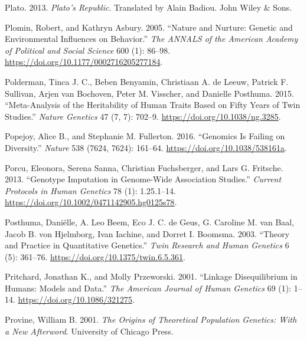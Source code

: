 \documentclass[
]{book}
\newlength{\cslhangindent}
\newlength{\cslentryspacingunit} %
\newenvironment{CSLReferences}[2] %
 {%
  \setlength{\parindent}{0pt}
  \ifodd #1
  \let\oldpar\par
  \def\par{\hangindent=\cslhangindent\oldpar}
  \fi
  \setlength{\parskip}{#2\cslentryspacingunit}
 }%
 {}
\begin{document}
\begin{CSLReferences}{1}{0}
\leavevmode{}%
Plato. 2013. \emph{Plato's {Republic}}. Translated by Alain Badiou. {John Wiley \& Sons}.

\leavevmode{}%
Plomin, Robert, and Kathryn Asbury. 2005. {``Nature and {Nurture}: {Genetic} and {Environmental Influences} on {Behavior}.''} \emph{The ANNALS of the American Academy of Political and Social Science} 600 (1): 86--98. \url{https://doi.org/10.1177/0002716205277184}.

\leavevmode{}%
Polderman, Tinca J. C., Beben Benyamin, Christiaan A. de Leeuw, Patrick F. Sullivan, Arjen van Bochoven, Peter M. Visscher, and Danielle Posthuma. 2015. {``Meta-Analysis of the Heritability of Human Traits Based on Fifty Years of Twin Studies.''} \emph{Nature Genetics} 47 (7, 7): 702--9. \url{https://doi.org/10.1038/ng.3285}.

\leavevmode{}%
Popejoy, Alice B., and Stephanie M. Fullerton. 2016. {``Genomics Is Failing on Diversity.''} \emph{Nature} 538 (7624, 7624): 161--64. \url{https://doi.org/10.1038/538161a}.

\leavevmode{}%
Porcu, Eleonora, Serena Sanna, Christian Fuchsberger, and Lars G. Fritsche. 2013. {``Genotype {Imputation} in {Genome-Wide Association Studies}.''} \emph{Current Protocols in Human Genetics} 78 (1): 1.25.1--14. \url{https://doi.org/10.1002/0471142905.hg0125s78}.

\leavevmode{}%
Posthuma, Daniëlle, A. Leo Beem, Eco J. C. de Geus, G. Caroline M. van Baal, Jacob B. von Hjelmborg, Ivan Iachine, and Dorret I. Boomsma. 2003. {``Theory and {Practice} in {Quantitative Genetics}.''} \emph{Twin Research and Human Genetics} 6 (5): 361--76. \url{https://doi.org/10.1375/twin.6.5.361}.

\leavevmode{}%
Pritchard, Jonathan K., and Molly Przeworski. 2001. {``Linkage {Disequilibrium} in {Humans}: {Models} and {Data}.''} \emph{The American Journal of Human Genetics} 69 (1): 1--14. \url{https://doi.org/10.1086/321275}.

\leavevmode{}%
Provine, William B. 2001. \emph{The Origins of Theoretical Population Genetics: With a New Afterword}. {University of Chicago Press}.


\end{CSLReferences}
\end{document}
